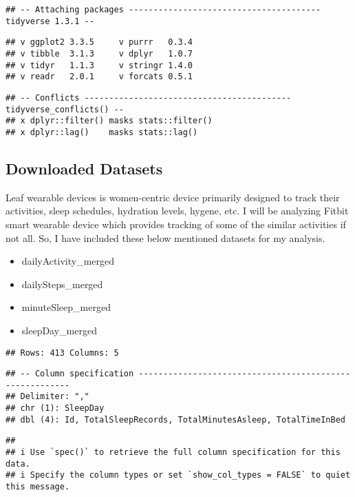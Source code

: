 \documentclass[
]{article}
\providecommand{\tightlist}{%
  \setlength{\itemsep}{0pt}\setlength{\parskip}{0pt}}
\begin{document}
\begin{verbatim}
## -- Attaching packages --------------------------------------- tidyverse 1.3.1 --
\end{verbatim}

\begin{verbatim}
## v ggplot2 3.3.5     v purrr   0.3.4
## v tibble  3.1.3     v dplyr   1.0.7
## v tidyr   1.1.3     v stringr 1.4.0
## v readr   2.0.1     v forcats 0.5.1
\end{verbatim}

\begin{verbatim}
## -- Conflicts ------------------------------------------ tidyverse_conflicts() --
## x dplyr::filter() masks stats::filter()
## x dplyr::lag()    masks stats::lag()
\end{verbatim}

\hypertarget{downloaded-datasets}{%
\subsection{Downloaded Datasets}\label{downloaded-datasets}}

Leaf wearable devices is women-centric device primarily designed to
track their activities, sleep schedules, hydration levels, hygene, etc.
I will be analyzing Fitbit smart wearable device which provides tracking
of some of the similar activities if not all. So, I have included these
below mentioned datasets for my analysis.

\begin{itemize}
\tightlist
\item
  dailyActivity\_merged
\item
  dailySteps\_merged
\item
  minuteSleep\_merged
\item
  sleepDay\_merged
\end{itemize}

\begin{verbatim}
## Rows: 413 Columns: 5
\end{verbatim}

\begin{verbatim}
## -- Column specification --------------------------------------------------------
## Delimiter: ","
## chr (1): SleepDay
## dbl (4): Id, TotalSleepRecords, TotalMinutesAsleep, TotalTimeInBed
\end{verbatim}

\begin{verbatim}
## 
## i Use `spec()` to retrieve the full column specification for this data.
## i Specify the column types or set `show_col_types = FALSE` to quiet this message.
\end{verbatim}
\end{document}
